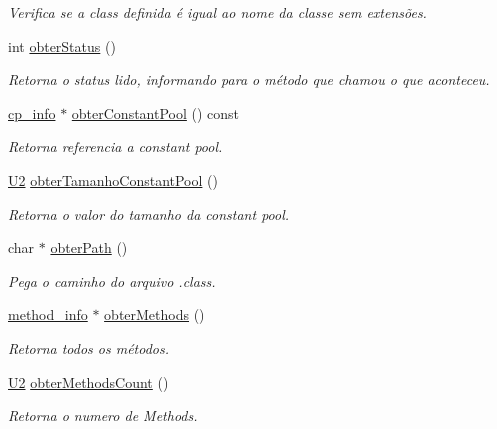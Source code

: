 \begin{DoxyCompactItemize}
\begin{DoxyCompactList}\small\item\em Verifica se a class definida é igual ao nome da classe sem extensões. \end{DoxyCompactList}\item 
int \hyperlink{classLeitorExibidor_a6a9e55a1b824fed37f0841cb253789b2}{obter\+Status} ()
\begin{DoxyCompactList}\small\item\em Retorna o status lido, informando para o método que chamou o que aconteceu. \end{DoxyCompactList}\item 
\hyperlink{structcp__info}{cp\+\_\+info} $\ast$ \hyperlink{classLeitorExibidor_ab286b420bb915f3444ec78a003f4c25c}{obter\+Constant\+Pool} () const
\begin{DoxyCompactList}\small\item\em Retorna referencia a constant pool. \end{DoxyCompactList}\item 
\hyperlink{BasicTypes_8h_a90240657108b1b457eef9d3f76e0202e}{U2} \hyperlink{classLeitorExibidor_a7e64ad9d2b5f914f6bc4a0f84129f160}{obter\+Tamanho\+Constant\+Pool} ()
\begin{DoxyCompactList}\small\item\em Retorna o valor do tamanho da constant pool. \end{DoxyCompactList}\item 
char $\ast$ \hyperlink{classLeitorExibidor_a74785a29369d04d5a7d14ed63a0b2102}{obter\+Path} ()
\begin{DoxyCompactList}\small\item\em Pega o caminho do arquivo .class. \end{DoxyCompactList}\item 
\hyperlink{structmethod__info}{method\+\_\+info} $\ast$ \hyperlink{classLeitorExibidor_a0fbc8db7d08d00ec8f12e26bbce93048}{obter\+Methods} ()
\begin{DoxyCompactList}\small\item\em Retorna todos os métodos. \end{DoxyCompactList}\item 
\hyperlink{BasicTypes_8h_a90240657108b1b457eef9d3f76e0202e}{U2} \hyperlink{classLeitorExibidor_aa9c91f4a145f4ef753c33f8898075930}{obter\+Methods\+Count} ()
\begin{DoxyCompactList}\small\item\em Retorna o numero de Methods. \end{DoxyCompactList}\item 

\end{DoxyCompactItemize}
